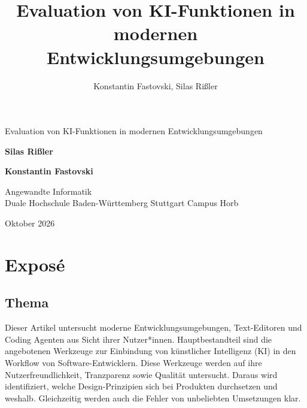 \documentclass[ngerman]{article}
\begin{document}
\title{Evaluation von KI-Funktionen in modernen Entwicklungsumgebungen}
\author{Konstantin Fastovski, Silas Rißler}
\begin{titlepage}
    \begin{center}
        \vspace{1cm}

        \Huge
        Evaluation von KI-Funktionen in modernen Entwicklungsumgebungen

        \LARGE
        \vspace{1.5cm}
        \textbf{Silas Rißler}

        \textbf{Konstantin Fastovski}

        \vfill

        \Large
        Angewandte Informatik \\
        Duale Hochschule Baden-Württemberg Stuttgart Campus Horb \\
        \vspace{1.5cm}

        Oktober 2026

        \vspace{1cm}
    \end{center}
\end{titlepage}

\newpage

\section{Exposé}
    \subsection{Thema}
    Dieser Artikel untersucht moderne Entwicklungsumgebungen, Text-Editoren und Coding Agenten aus Sicht ihrer Nutzer*innen. Hauptbestandteil sind die angebotenen Werkzeuge zur Einbindung von künstlicher Intelligenz (KI) in den Workflow von Software-Entwicklern. Diese Werkzeuge werden auf ihre Nutzerfreundlichkeit, Tranzparenz sowie Qualität untersucht. Daraus wird identifiziert, welche Design-Prinzipien sich bei Produkten durchsetzen und weshalb. Gleichzeitig werden auch die Fehler von unbeliebten Umsetzungen klar.
\end{document}
